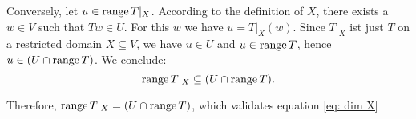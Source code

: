 \begin{xrcs}
\begin{prf}
    Conversely, let $u \in \operatorname{range} T|_X$. According to the definition of $X$, there exists a $w \in V$ such that $Tw \in U$. For this $w$ we have $u = T|_X (w)$. Since $T|_X$ ist just $T$ on a restricted domain $X \subseteq V$, we have $u \in U$ and $u \in \operatorname{range} T$, hence $u \in (U \cap \operatorname{range} T)$. We conclude:
    \begin{equation}
      \operatorname{range} T|_X \subseteq (U \cap \operatorname{range} T).
    \end{equation}

    Therefore, $\operatorname{range} T|_X = (U \cap \operatorname{range} T)$, which validates equation \eqref{eq: dim X}
  \end{prf}
\end{xrcs}

%
%
%
%
%
%
